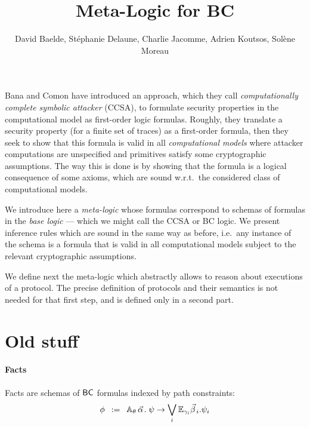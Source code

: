 \documentclass[a4paper]{article}
\theoremstyle{remark}
\begin{document}
\title{Meta-Logic for BC}

\author{David Baelde, Stéphanie Delaune,
  Charlie Jacomme, Adrien Koutsos, Solène Moreau}

\maketitle

\vfill

\tableofcontents

\vfill

\newpage

Bana and Comon have introduced an approach, which they call
\emph{computationally complete symbolic attacker} (CCSA),
to formulate security properties in the computational model as first-order
logic formulas. Roughly, they translate a security property (for a finite set
of traces) as a first-order formula, then they seek to show that this formula
is valid in all \emph{computational models} where attacker computations
are unspecified and primitives satisfy some cryptographic assumptions. The
way this is done is by showing that the formula is a logical consequence of
some axioms, which are sound w.r.t.\ the considered class of computational
models.

We introduce here a \emph{meta-logic} whose formulas correspond to schemas
of formulas in the \emph{base logic}
--- which we might call the CCSA or BC logic.
We present inference rules which are sound in the same way as before,
i.e.\ any instance of the schema is a formula that is valid in all
computational models subject to the relevant cryptographic assumptions.

We define next the meta-logic which abstractly allows to reason about
executions of a protocol. The precise definition of protocols and their
semantics is not needed for that first step, and is defined only in a
second part.





\newpage

\section{Old stuff}



\paragraph{Facts}
Facts are schemas of $\textsf{BC}$ formulas indexed by path constraints:
\[
  \phi \mdef
  \cforall_\theta\, \valpha.\;
  \psi
  \ra
  \bigvee_{i}
  \cexists_\gammai \vbetai. \psi_i
\]
\end{document}
